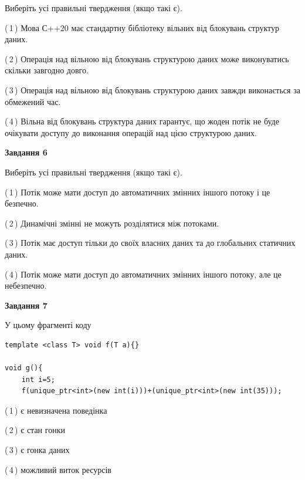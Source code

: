 \documentclass[12pt, ukrainian]{article}
\begin{document}
\begin {large}
{Виберіть усі правильні твердження (якщо такі є).\par
\vspace{2mm}

(\,1\,) Мова С++20 має стандартну бібліотеку вільних від блокувань структур даних.%

(\,2\,) Операція над вільною від блокувань структурою даних може виконуватись скільки завгодно довго.%

(\,3\,) Операція над вільною від блокувань структурою даних завжди виконається за обмежений час.%

(\,4\,) Вільна від блокувань структура даних гарантує, що жоден потік не буде очікувати доступу до виконання операцій над цією структурою даних.%
\newpage


\begin{center}
\textbf{Завдання 6}
\end{center}

Виберіть усі правильні твердження (якщо такі є).\par
\vspace{2mm}

(\,1\,) Потік може мати доступ до автоматичних змінних іншого потоку і це безпечно.%

(\,2\,) Динамічні змінні не можуть розділятися між потоками.%

(\,3\,) Потік має доступ тільки до своїх власних даних та до глобальних статичних даних.%

(\,4\,) Потік може мати доступ до автоматичних змінних іншого потоку, але це небезпечно.%


\begin{center}
\textbf{Завдання 7}
\end{center}

У цьому фрагменті коду
\begin{verbatim}
template <class T> void f(T a){}

void g(){
    int i=5;
    f(unique_ptr<int>(new int(i)))+(unique_ptr<int>(new int(35)));
\end{verbatim}
(\,1\,) є невизначена поведінка%

(\,2\,) є стан гонки%

(\,3\,) є гонка даних%

(\,4\,) можливий виток ресурсів%

}
\end {large}

\vspace{4mm}
\newpage
\end{document}
